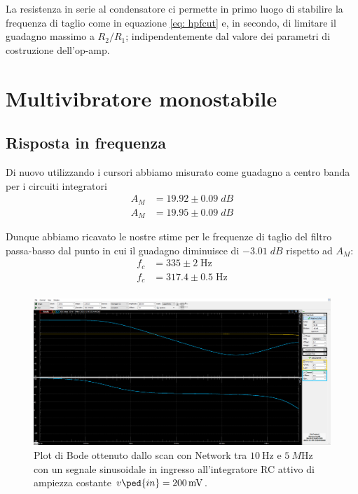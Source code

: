 \documentclass[10pt,a4paper]{article}
\begin{document}
La resistenza in serie al condensatore ci permette in primo luogo di
stabilire la frequenza di taglio come in equazione \eqref{eq: hpfcut} e,
in secondo, di limitare il guadagno massimo a $R_2/R_1$;
indipendentemente dal valore dei parametri di costruzione dell'op-amp.

\section{Multivibratore monostabile}
\subsection{Risposta in frequenza}
Di nuovo utilizzando i cursori abbiamo misurato come guadagno a centro banda
per i circuiti integratori
\begin{align*}
A_M &= 19.92 \pm 0.09 \; \si{dB} \\
A_M &= 19.95 \pm 0.09 \; \si{dB}
\end{align*}

Dunque abbiamo ricavato le nostre stime per le frequenze di taglio del filtro
passa-basso dal punto in cui il guadagno diminuisce di $-3.01 \; \si{dB}$
rispetto ad $A_M$:
\begin{align*}
f_c &= 335 \pm 2 \; \si{\Hz} \\
f_c &= 317.4 \pm 0.5 \; \si{\Hz} \\
\end{align*}

\begin{figure}[htbp]
\centering
\includegraphics[scale=0.335]{lpfbode}
\caption{Plot di Bode ottenuto dallo scan con Network tra $\SI{10}{\Hz}$ e
$\SI{5}{M\Hz}$ con un segnale sinusoidale in ingresso all'integratore RC
attivo di ampiezza costante $v\ped{in} = \SI{200}{m\V}$.
\label{fig: intbode}}
\end{figure}
\end{document}

